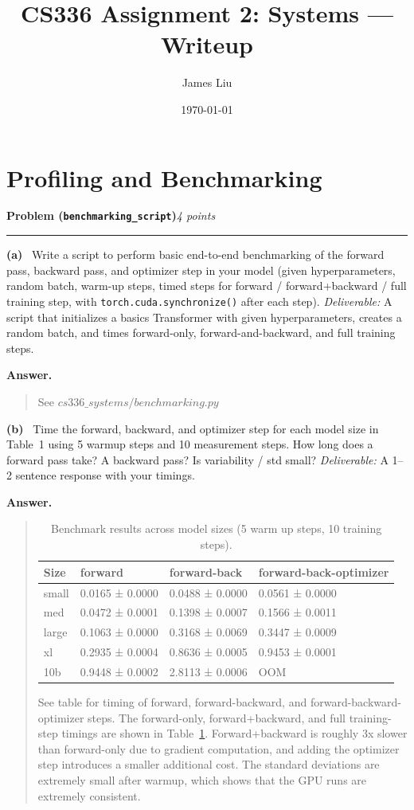 \documentclass[11pt]{article}
\title{CS336 Assignment 2: Systems --- Writeup}
\author{James Liu}
\date{\today}
\newcommand{\problem}[2]{%
  \vspace{0.6em}%
  \noindent\textbf{Problem (\texttt{#1})}\hfill\textit{#2 points}\par%
  \vspace{0.2em}\hrule\vspace{0.4em}%
}
\newcommand{\subq}[1]{\vspace{0.3em}\noindent\textbf{(#1)}\ }
\newcommand{\deliverable}[1]{\vspace{0.2em}\noindent\textit{Deliverable:} #1\par}
\newenvironment{answer}{%
  \vspace{0.3em}%
  \noindent\textbf{Answer.}\begin{quote}%
}{%
  \end{quote}\vspace{0.4em}%
}
\begin{document}
\maketitle

\section{Profiling and Benchmarking}

\problem{benchmarking\_script}{4}

\subq{a} Write a script to perform basic end-to-end benchmarking of the forward pass, backward pass, and optimizer step in your model (given hyperparameters, random batch, warm-up steps, timed steps for forward / forward+backward / full training step, with \texttt{torch.cuda.synchronize()} after each step).
\deliverable{A script that initializes a basics Transformer with given hyperparameters, creates a random batch, and times forward-only, forward-and-backward, and full training steps.}
\begin{answer}
See $cs336\_systems/benchmarking.py$
\end{answer}

\newpage
\subq{b} Time the forward, backward, and optimizer step for each model size in Table~1 using 5 warmup steps and 10 measurement steps. How long does a forward pass take? A backward pass? Is variability / std small?
\deliverable{A 1--2 sentence response with your timings.}
\begin{answer}
  \begin{table}[H]
    \centering
    \caption{Benchmark results across model sizes (5 warm up steps, 10 training steps).}
    \label{tab:model-benchmark-results}
    \begin{tabular}{llll}
    \toprule
    Size & forward & forward-back & forward-back-optimizer \\
    \midrule
    small & 0.0165 ± 0.0000 & 0.0488 ± 0.0000 & 0.0561 ± 0.0000 \\
    med & 0.0472 ± 0.0001 & 0.1398 ± 0.0007 & 0.1566 ± 0.0011 \\
    large & 0.1063 ± 0.0000 & 0.3168 ± 0.0069 & 0.3447 ± 0.0009 \\
    xl & 0.2935 ± 0.0004 & 0.8636 ± 0.0005 & 0.9453 ± 0.0001 \\
    10b & 0.9448 ± 0.0002 & 2.8113 ± 0.0006 & OOM \\
    \bottomrule
    \end{tabular}
    \end{table}  
    See table for timing of forward, forward-backward, and forward-backward-optimizer steps. 
    The forward-only, forward+backward, and full training-step timings are shown in 
    Table~\ref{tab:model-benchmark-results}. Forward+backward is roughly 3x 
    slower than forward-only due to gradient computation, and adding the optimizer 
    step introduces a smaller additional cost. The standard deviations are extremely 
    small after warmup, which shows that the GPU runs are extremely consistent. 
\end{answer}
\end{document}

